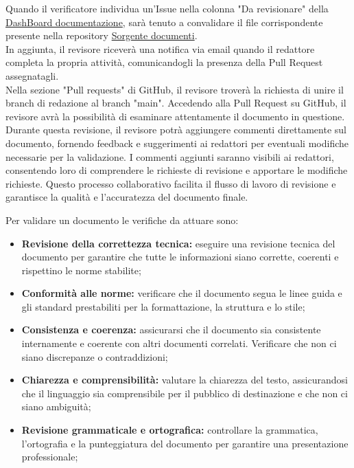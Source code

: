 Quando il verificatore individua un'Issue nella colonna "Da revisionare" della \href{https://github.com/orgs/ByteOps-swe/projects/1/views/1}{DashBoard documentazione}, sarà tenuto a convalidare il file corrispondente presente nella repository \href{https://github.com/ByteOps-swe/Sorgente-documenti}{Sorgente documenti}. \\
In aggiunta, il revisore riceverà una notifica via email quando il redattore completa la propria attività, comunicandogli la presenza della Pull Request assegnatagli.\\
Nella sezione "Pull requests" di GitHub, il revisore troverà la richiesta di unire il branch di redazione al branch "main". Accedendo alla Pull Request su GitHub, il revisore avrà la possibilità di esaminare attentamente il documento in questione. Durante questa revisione, il revisore potrà aggiungere commenti direttamente sul documento, fornendo feedback e suggerimenti ai redattori per eventuali modifiche necessarie per la validazione. I commenti aggiunti saranno visibili ai redattori, consentendo loro di comprendere le richieste di revisione e apportare le modifiche richieste. Questo processo collaborativo facilita il flusso di lavoro di revisione e garantisce la qualità e l'accuratezza del documento finale.

\vspace{0.3cm}

Per validare un documento le verifiche da attuare sono:
\begin{itemize}
    \item \textbf{Revisione della correttezza tecnica:} 
        eseguire una revisione tecnica del documento per garantire che tutte le informazioni siano corrette, coerenti e rispettino le norme stabilite;
    \item \textbf{Conformità alle norme:} 
        verificare che il documento segua le linee guida e gli standard prestabiliti per la formattazione, la struttura e lo stile;
    \item \textbf{Consistenza e coerenza:} 
        assicurarsi che il documento sia consistente internamente e coerente con altri documenti correlati. Verificare che non ci siano discrepanze o contraddizioni;
    \item \textbf{Chiarezza e comprensibilità:} 
        valutare la chiarezza del testo, assicurandosi che il linguaggio sia comprensibile per il pubblico di destinazione e che non ci siano ambiguità;
    \item \textbf{Revisione grammaticale e ortografica:} 
        controllare la grammatica, l'ortografia e la punteggiatura del documento per garantire una presentazione professionale;
\end{itemize}

